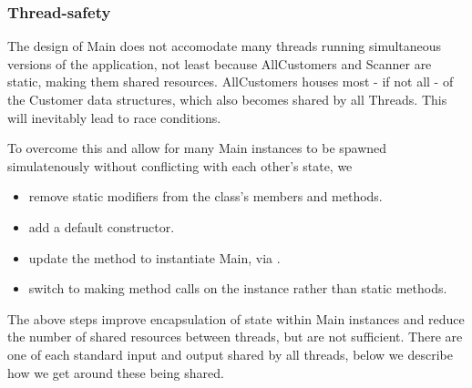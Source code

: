 \subsubsection{Thread-safety}
The design of Main does not accomodate many threads running simultaneous versions of the application, not least because AllCustomers and Scanner are static, making them shared resources. AllCustomers houses most - if not all - of the Customer data structures, which also becomes shared by all Threads. This will inevitably lead to race conditions. 
\par 
To overcome this and allow for many Main instances to be spawned simulatenously without conflicting with each other's state, we 
\begin{itemize}[noitemsep]
	\item remove static modifiers from the class's members and methods.  
	\item add a default constructor.
	\item update the  method to instantiate Main, via .
	\item switch to making method calls on the instance rather than static methods. 
\end{itemize}
The above steps improve encapsulation of state within Main instances and reduce the number of shared resources between threads, but are not sufficient. There are one of each standard input and output shared by all threads, below we describe how we get around these being shared. 

